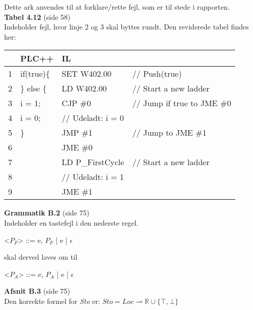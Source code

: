 \documentclass[a4paper,11pt,twoside]{report}
\begin{document}
\noindent Dette ark anvendes til at forklare/rette fejl, som er til stede i rapporten.\\

\noindent \textbf{Tabel 4.12} (side 58)\\
\noindent Indeholder fejl, hvor linje 2 og 3 skal byttes rundt. Den reviderede tabel findes her: 

\begin{table}[H]
    \centering\ttfamily
    \begin{tabular}{l|l|l l}
         &PLC++                 & IL \\\hline
        1&if(true)\{            & SET W402.00       &// Push(true)\\
        2&\} else \{            & LD W402.00        &// Start a new ladder\\
        3&  i = 1;              & CJP \#0           &// Jump if true to JME \#0\\
        4&  i = 0;              & // Udeladt: i = 0\\
        5& \}                   & JMP \#1           &// Jump to JME \#1\\
        6&                      & JME \#0           &\\
        7&                      & LD P\_FirstCycle  &// Start a new ladder\\
        8&                      & // Udeladt: i = 1\\
        9&                      & JME \#1
    \end{tabular}
\end{table}

\noindent \textbf{Grammatik B.2} (side 75)\\
\noindent Indeholder en tastefejl i den nederste regel.

\begin{grammar}
   <$P_F$> ::= e, $P_F$ | e | $\epsilon$
\end{grammar}

\noindent skal derved laves om til 

\begin{grammar}
   <$P_A$> ::= e, $P_A$ | e | $\epsilon$
\end{grammar}

\noindent \textbf{Afsnit B.3} (side 75)\\
\noindent Den korrekte formel for \textit{Sto} er: $Sto = Loc \rightharpoonup \mathds{R} \cup \{\top, \bot\}$\\
\end{document}
